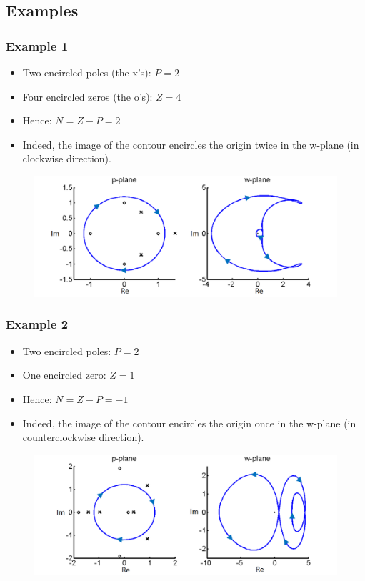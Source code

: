 \subsection{Examples}

\begin{frame}
	\frametitle{Example 1}
	\begin{itemize}
		\item Two encircled poles (the x's): $P=2$
		\item Four encircled zeros (the o's): $Z=4$
		\item Hence: $N = Z-P = 2$
		\item Indeed, the image of the contour encircles the origin twice in the w-plane (in clockwise direction).
	\end{itemize}
	\vspace{-2ex}
	\begin{figure}
		\includegraphics[width=0.95\linewidth]{example1}
	\end{figure}
\end{frame}

\begin{frame}
	\frametitle{Example 2}
	\begin{itemize}
		\item Two encircled poles: $P = 2$
		\item One encircled zero: $Z=1$
		\item Hence: $N=Z-P=-1$
		\item Indeed, the image of the contour encircles the origin once in the w-plane (in counterclockwise direction).
	\end{itemize}
	\vspace{-2ex}
	\begin{figure}
		\includegraphics[width=0.95\linewidth]{example2}
	\end{figure}
\end{frame}

